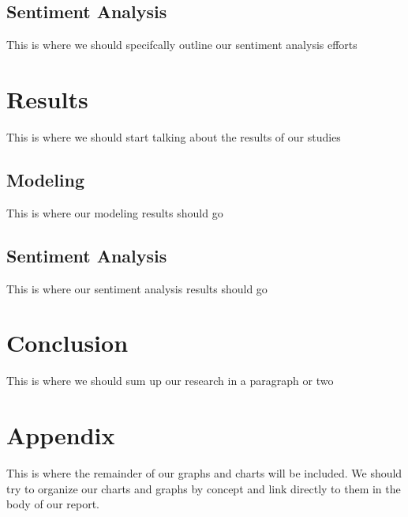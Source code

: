 \documentclass[11pt,english]{article}
\begin{document}
\subsection{Sentiment Analysis}
    This is where we should specifcally outline our sentiment analysis efforts

\section{Results}
    This is where we should start talking about the results of our studies

\subsection{Modeling}
    This is where our modeling results should go

\subsection{Sentiment Analysis}
    This is where our sentiment analysis results should go

\section{Conclusion}
    This is where we should sum up our research in a paragraph or two

\newpage
\section{Appendix}
    This is where the remainder of our graphs and charts will be included. We should try to organize our charts and graphs by concept and link directly to them in the body of our report.
\end{document}
